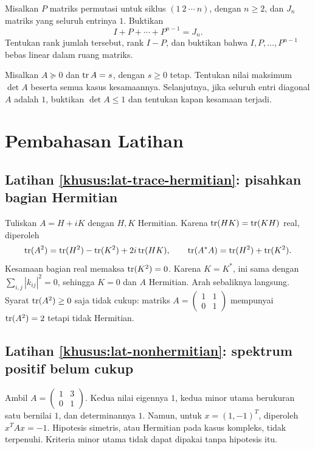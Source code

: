 \begin{latihan}\label{khusus:lat-siklik}
    Misalkan $P$ matriks permutasi untuk siklus $(1\ 2\ \cdots\ n)$,
    dengan $n\ge2$, dan $J_n$ matriks yang seluruh entrinya $1$.
    Buktikan
    \[
        I+P+\cdots+P^{n-1}=J_n.
    \]
    Tentukan rank jumlah tersebut, rank $I-P$, dan buktikan
    bahwa $I,P,\ldots,P^{n-1}$ bebas linear dalam ruang matriks.
\end{latihan}

\begin{latihan}\label{khusus:lat-determinan-trace}
    Misalkan $A\succeq0$ dan $\operatorname{tr} A=s$, dengan $s\ge0$ tetap.
    Tentukan nilai maksimum $\det A$ beserta semua kasus kesamaannya.
    Selanjutnya, jika seluruh entri diagonal $A$ adalah $1$,
    buktikan $\det A\le1$ dan tentukan kapan kesamaan terjadi.
\end{latihan}

\ifpembahasan
\section{Pembahasan Latihan}
\label{khusus:pembahasan}

\subsection*{Latihan \ref{khusus:lat-trace-hermitian}: pisahkan bagian Hermitian}
Tuliskan $A=H+iK$ dengan $H,K$ Hermitian.
Karena $\operatorname{tr}(HK)=\operatorname{tr}(KH)$ real, diperoleh
\[
    \operatorname{tr}(A^2)=\operatorname{tr}(H^2)-\operatorname{tr}(K^2)+2i\operatorname{tr}(HK),\qquad
    \operatorname{tr}(A^*A)=\operatorname{tr}(H^2)+\operatorname{tr}(K^2).
\]
Kesamaan bagian real memaksa $\operatorname{tr}(K^2)=0$.
Karena $K=K^*$, ini sama dengan $\sum_{i,j}|k_{ij}|^2=0$,
sehingga $K=0$ dan $A$ Hermitian. Arah sebaliknya langsung.
Syarat $\operatorname{tr}(A^2)\ge0$ saja tidak cukup: matriks
$A=\begin{pmatrix}1&1\\0&1\end{pmatrix}$ mempunyai
$\operatorname{tr}(A^2)=2$ tetapi tidak Hermitian.

\subsection*{Latihan \ref{khusus:lat-nonhermitian}: spektrum positif belum cukup}
Ambil $A=\begin{pmatrix}1&3\\0&1\end{pmatrix}$.
Kedua nilai eigennya $1$, kedua minor utama berukuran satu
bernilai $1$, dan determinannya $1$.
Namun, untuk $x=(1,-1)^T$, diperoleh $x^TAx=-1$.
Hipotesis simetris, atau Hermitian pada kasus kompleks, tidak
terpenuhi. Kriteria minor utama tidak dapat dipakai tanpa hipotesis itu.

